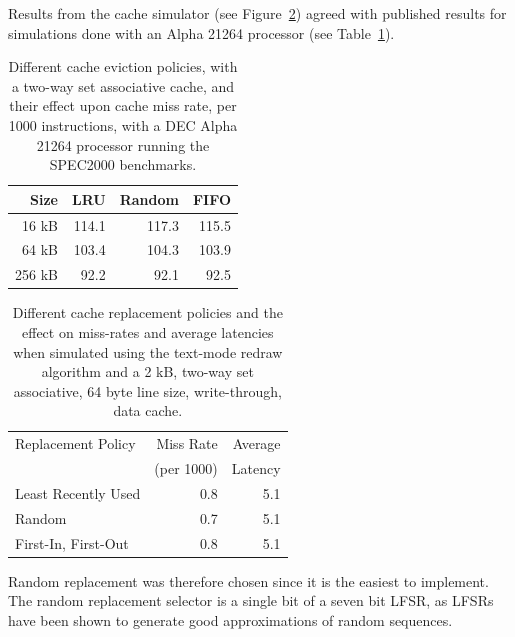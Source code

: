 Results from the cache simulator (see Figure~\ref{Mem_OpenVGA_Evict_Policy})
agreed with published results for simulations done with an Alpha 21264
processor\cite{Comp_Arch} (see Table~\ref{Mem_Alpha_Evict_Policy}).

\begin{table}[h!]
\begin{center}
\begin{tabular}{r r r r}
Size & LRU & Random & FIFO \\
\hline
16 kB & 114.1 & 117.3 & 115.5 \\
64 kB & 103.4 & 104.3 & 103.9 \\
256 kB & 92.2 & 92.1 & 92.5 \\
\end{tabular}
\caption[DEC Alpha 21264 cache eviction policy vs. performance]{Different
cache eviction policies, with a two-way set associative cache, and their effect
upon cache miss rate, per 1000 instructions, with a DEC Alpha 21264 processor
running the SPEC2000 benchmarks\cite{Comp_Arch}.}
\label{Mem_Alpha_Evict_Policy}
\end{center}
\end{table}

\begin{table}[h!]
\begin{center}
\begin{tabular}{l r r}
Replacement Policy & Miss Rate & Average \\
 & (per 1000) & Latency \\
\hline
Least Recently Used & 0.8 & 5.1 \\
Random & 0.7 & 5.1 \\
First-In, First-Out & 0.8 & 5.1 \\
\end{tabular}
\caption[Cache eviction policy vs. performance]{Different cache replacement
policies and the effect on miss-rates and average latencies when simulated
using the text-mode redraw algorithm and a 2 kB, two-way set associative, 64
byte line size, write-through, data cache.}
\label{Mem_OpenVGA_Evict_Policy}
\end{center}
\end{table}

Random replacement was therefore chosen since it is the easiest to implement. The
random replacement selector is a single bit of a seven bit LFSR, as LFSRs have
been shown to generate good approximations of random
sequences\cite{dufaza1991lbd}.


